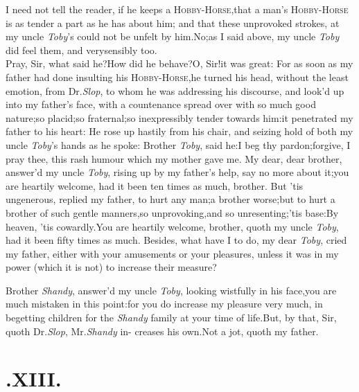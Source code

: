 \documentclass{article}
\begin{document}
I need not tell the reader, if he keeps a
\textsc{Hobby-Horse},\tsk that a man’s
\textsc{Hobby-Horse} is as tender a part as he
has\break
about him; and that these unprovoked strokes, at my uncle
\textit{Toby}’s could not be unfelt by
him.\tsk No;\tsk as I said above, my uncle
\textit{Toby} did feel them, and very\break sensibly too.\\
\newpage
Pray, Sir, what said he?\tsk How did he behave?\tsk O,
Sir!\tsk it was great: For as soon as my father had done insulting his
\textsc{Hobby-Horse},\tsh he turned
his head, without the least emotion, from Dr.\@ \textit{Slop}, to whom
he was addressing his discourse, and look’d up into my
father’s face, with a countenance spread over with so much
good nature;\tsh so placid;\tsk so
fraternal;\tsk so inexpressibly tender towards
him:\tsk it penetrated my father to his heart: He rose up hastily
from his chair, and seizing hold of both my uncle
\textit{Toby}’s hands as he spoke:\tsh\break
Brother \textit{Toby}, said he:\tsk I beg thy pardon;\tsk forgive, I pray thee,
this rash humour which my mother gave me.\tsk\break
My dear, dear brother, answer’d my uncle \textit{Toby}, rising up by my
father’s help, say no more about it;\tsk you are heartily
welcome, had it been ten times as much,
brother. But ’tis
ungenerous, replied my father, to hurt any man;\tsh a
brother worse;\tsk but to hurt a brother of such gentle
manners,\tsk so unprovoking,\tsk and so
unresenting;\tsk ’tis base:\tsk By heaven,
’tis cowardly.\tsh You are heartily welcome, brother, quoth
my uncle \textit{Toby},\tsk\break
had it been fifty times as much.\tsh\break
Besides, what have I to do, my
dear \textit{Toby}, cried my father, either with your amusements or
your pleasures, unless it was in my power (which it is not) to
increase\break
their measure?

\tsk Brother \textit{Shandy}, answer’d my uncle
\textit{Toby}, looking wistfully in his face,\tsk you are
much mistaken in this point:\tsk for you do increase my pleasure
very much, in begetting children for the \textit{Shandy} family at
your time of life.\tsh But, by that, Sir, quoth Dr.\@ \textit{Slop},
Mr.\@ \textit{Shandy} in-
creases his own.\tsh Not a jot, quoth\break
my father.

\bigskip

\section{.\enspace  XIII.}
\end{document}
